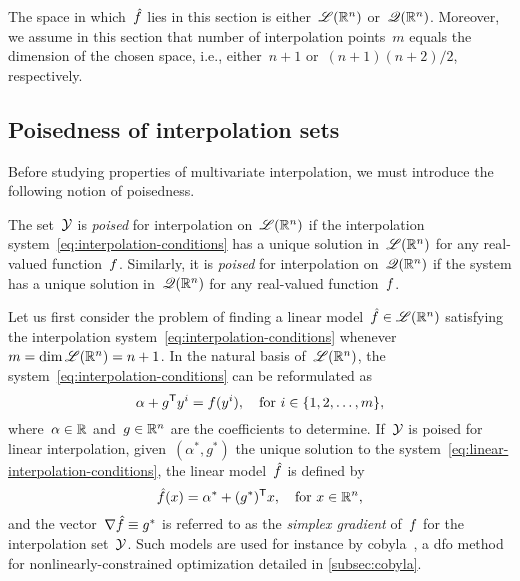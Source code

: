 The space in which~$\objm$ lies in this section is either~$\mathscr{L}(\mathbb{R}^n)$ or~$\mathscr{Q}(\mathbb{R}^n)$.
Moreover, we assume in this section that number of interpolation points~$m$ equals the dimension of the chosen space, i.e., either~$n + 1$ or~$(n + 1)(n + 2) / 2$, respectively.

\subsection{Poisedness of interpolation sets}
\label{subsec:poisedness}

Before studying properties of multivariate interpolation, we must introduce the following notion of poisedness.

\begin{definition}[Poisedness]
    The set~$\xpt$ is \emph{poised} for interpolation on~$\mathscr{L}(\mathbb{R}^n)$ if the interpolation system~\cref{eq:interpolation-conditions} has a unique solution in~$\mathscr{L}(\mathbb{R}^n)$ for any real-valued function~$f$.
    Similarly, it is \emph{poised} for interpolation on~$\mathscr{Q}(\mathbb{R}^n)$ if the system has a unique solution in~$\mathscr{Q}(\mathbb{R}^n)$ for any real-valued function~$f$.
\end{definition}

Let us first consider the problem of finding a linear model~$\objm \in \lpoly$ satisfying the interpolation system~\cref{eq:interpolation-conditions} whenever~$m = \dim \mathscr{L}(\mathbb{R}^n) = n + 1$.
In the natural basis of~$\mathscr{L}(\mathbb{R}^n)$, the system~\cref{eq:interpolation-conditions} can be reformulated as
\begin{equation}
    \label{eq:linear-interpolation-conditions}
    \alpha + g^{\mathsf{T}} y^i = f(y^i), \quad \text{for~$i \in \{1, 2, \dots, m\}$},
\end{equation}
where~$\alpha \in \mathbb{R}$ and~$g \in \mathbb{R}^n$ are the coefficients to determine.
If~$\xpt$ is poised for linear interpolation, given~$(\alpha^{\ast}, g^{\ast})$ the unique solution to the system~\cref{eq:linear-interpolation-conditions}, the linear model~$\objm$ is defined by
\begin{equation*}
    \objm(\iter) = \alpha^{\ast} + (g^{\ast})^{\T} x, \quad \text{for~$\iter \in \R^n$},
\end{equation*}
and the vector~$\nabla \objm \equiv g^{\ast}$ is referred to as the \emph{simplex gradient} of~$f$ for the interpolation set~$\xpt$.
Such models are used for instance by \gls{cobyla}~\cite{Powell_1994}, a \gls{dfo} method for nonlinearly-constrained optimization detailed in \cref{subsec:cobyla}.

